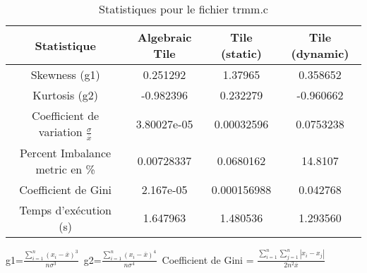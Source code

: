\documentclass{article}
\begin{document}
\begin{table}[htbp]
  \centering
  \caption{Statistiques pour le fichier trmm.c}
  \begin{tabular}{|c|c|c|c|}
    \hline
    Statistique & Algebraic Tile & Tile (static) & Tile (dynamic) \\ 
    \hline
    Skewness (g1)  & 0.251292 & 1.37965 & 0.358652 \\ 
    Kurtosis (g2)  & -0.982396 & 0.232279 & -0.960662 \\ 
    Coefficient de variation $ \frac{\sigma}{\overline{x}} $ & 3.80027e-05 & 0.00032596 & 0.0753238\\ 
    Percent Imbalance metric en \% & 0.00728337 & 0.0680162 & 14.8107\\ 
    Coefficient de Gini  & 2.167e-05 & 0.000156988 & 0.042768\\ 
    Temps d'exécution (s) &  1.647963    &  1.480536   &  1.293560   \\ 

    \hline
  \end{tabular}
\end{table}\newline
g1=$ \frac{\sum_{i=1}^{n} (x_i - \overline{x})^3}{n\sigma^3} $\
g2=$ \frac{\sum_{i=1}^{n} (x_i - \overline{x})^4}{n\sigma^4} $\
Coefficient de Gini = $ \frac{\sum_{i=1}^{n}\sum_{j=1}^{n} |x_i - x_j|}{2n^2\overline{x}} $\
\newpage
\end{document}
